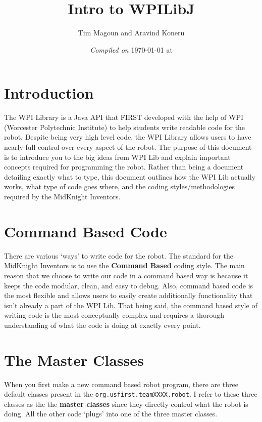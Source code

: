 \documentclass[11pt,fleqn]{article}
\begin{document}
\title{Intro to WPILibJ}%
\author{Tim Magoun and Aravind Koneru}
\date{\textit{Compiled on} \today \hspace{1mm} at \currenttime}
\maketitle

\section{Introduction}

The WPI Library is a Java API that FIRST developed with the help of WPI (Worcester Polytechnic Institute)
to help students write readable code for the robot. Despite being very high level code, the WPI Library
allows users to have nearly full control over every aspect of the robot. The purpose of this document
is to introduce you to the big ideas from WPI Lib and explain important concepts required for programming
the robot. Rather than being a document detailing exactly what to type, this document outlines how the
WPI Lib actually works, what type of code goes where, and the coding styles/methodologies required by
the MidKnight Inventors. 

\section{Command Based Code}

There are various `ways' to write code for the robot. The standard for the MidKnight Inventors is to use
the \textbf{Command Based} coding style. The main reason that we choose to write our code in a command
based way is because it keeps the code modular, clean, and easy to debug. Also, command based code is
the most flexible and allows users to easily create additionally functionality that isn't already a part
of the WPI Lib. That being said, the command based style of writing code is the most conceptually complex
and requires a thorough understanding of what the code is doing at exactly every point. 

\section{The Master Classes}

When you first make a new command based robot program, there are three default classes present in the
\texttt{org.usfirst.teamXXXX.robot}. I refer to these three classes as the the \textbf{master classes}
since they directly control what the robot is doing. All the other code `plugs' into one of the three
master classes. 
\end{document}
